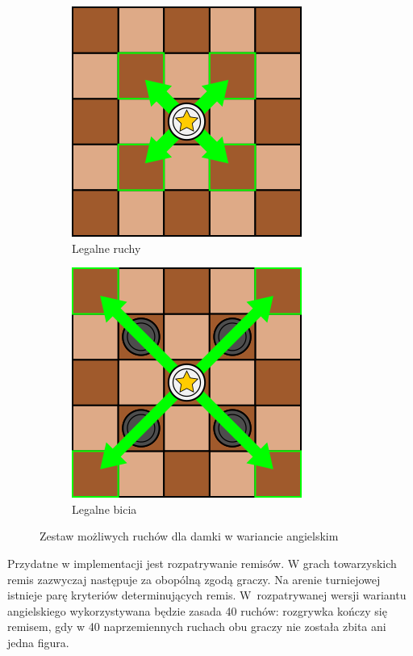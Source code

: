 \begin{figure}
\centering
\begin{subfigure}{.5\textwidth}
  \centering
  \includegraphics[scale=.6]{graphics/warcaby_ruchyDamkaZwykle.png}
  \caption{Legalne ruchy}
  \label{fig:sub11}
\end{subfigure}%
\begin{subfigure}{.5\textwidth}
  \centering
  \includegraphics[scale=.6]{graphics/warcaby_ruchyDamkaBicia.png}
  \caption{Legalne bicia}
  \label{fig:sub22}
\end{subfigure}
\caption{Zestaw możliwych ruchów dla damki w wariancie angielskim}
\label{fig:damka}
\end{figure}

\FloatBarrier

Przydatne w implementacji jest rozpatrywanie remisów. W grach towarzyskich remis zazwyczaj następuje za obopólną zgodą graczy. Na arenie turniejowej istnieje parę kryteriów determinujących remis. W~rozpatrywanej wersji wariantu angielskiego wykorzystywana będzie zasada 40 ruchów: rozgrywka kończy się remisem, gdy w 40 naprzemiennych ruchach obu graczy nie została zbita ani jedna figura.

